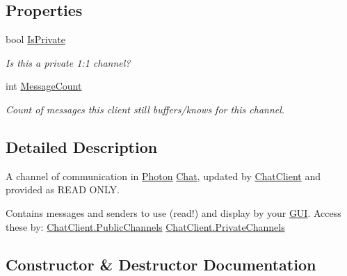 \subsection*{Properties}
\begin{DoxyCompactItemize}
\item 
bool \hyperlink{class_exit_games_1_1_client_1_1_photon_1_1_chat_1_1_chat_channel_a3486dbba0f3a83529fe4f327375548cb}{Is\+Private}
\begin{DoxyCompactList}\small\item\em Is this a private 1\+:1 channel?\end{DoxyCompactList}\item 
int \hyperlink{class_exit_games_1_1_client_1_1_photon_1_1_chat_1_1_chat_channel_a91a15ffc97cfd40eea6cf7965b99e5dc}{Message\+Count}
\begin{DoxyCompactList}\small\item\em Count of messages this client still buffers/knows for this channel.\end{DoxyCompactList}\end{DoxyCompactItemize}


\subsection{Detailed Description}
A channel of communication in \hyperlink{namespace_exit_games_1_1_client_1_1_photon}{Photon} \hyperlink{namespace_exit_games_1_1_client_1_1_photon_1_1_chat}{Chat}, updated by \hyperlink{class_exit_games_1_1_client_1_1_photon_1_1_chat_1_1_chat_client}{Chat\+Client} and provided as R\+E\+AD O\+N\+LY. 

Contains messages and senders to use (read!) and display by your \hyperlink{namespace_exit_games_1_1_client_1_1_g_u_i}{G\+UI}. Access these by\+: \hyperlink{class_exit_games_1_1_client_1_1_photon_1_1_chat_1_1_chat_client_aa3d4261b652969dd5f94971ca48f5a7e}{Chat\+Client.\+Public\+Channels} \hyperlink{class_exit_games_1_1_client_1_1_photon_1_1_chat_1_1_chat_client_a25f9db0c022bb0feda81d31f43053a81}{Chat\+Client.\+Private\+Channels} 

\subsection{Constructor \& Destructor Documentation}
